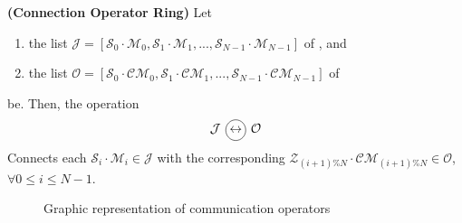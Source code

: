 \begin{definition}\label{op_conn:ring}
{\bf (Connection Operator Ring)} Let 
\begin{enumerate} 
\item the list $\mathcal{J} = \left[\mathcal{S}_0\cdot \mathcal{M}_0, \mathcal{S}_1\cdot \mathcal{M}_1, ..., \mathcal{S}_{N-1}\cdot \mathcal{M}_{N-1}\right]$ of \jacks, and 
\item the list $\mathcal{O} = \left[\mathcal{S}_0\cdot \mathcal{CM}_0, \mathcal{S}_1\cdot \mathcal{CM}_1, ..., \mathcal{S}_{N-1}\cdot \mathcal{CM}_{N-1}\right]$ of \outlets{} 
\end{enumerate} be. Then, the operation 
\[
\mathcal{J} \poslop{\leftrightarrow} \mathcal{O}
\]
Connects each \jack{} $\mathcal{S}_i\cdot \mathcal{M}_i \in \mathcal{J}$ with the corresponding \outlet{} $\mathcal{Z}_{(i+1)\%N}\cdot \mathcal{CM}_{(i+1)\%N} \in \mathcal{O}$, $\forall 0 \leq i \leq N-1$.
\end{definition}

\begin{figure}[h]
\centering
{}
\hspace{0.05\textwidth}%
\hspace{0.05\textwidth}%
\caption[]{Graphic representation of communication operators}
\label{fig:comm}
\end{figure}

 

